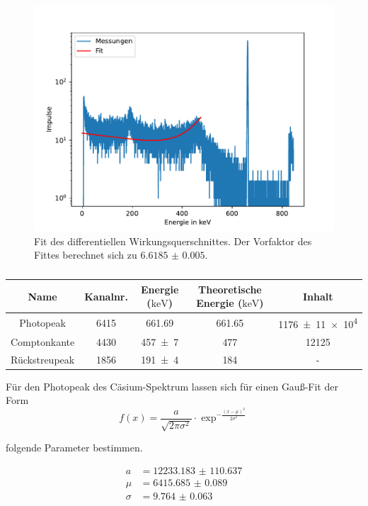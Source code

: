 \begin{figure}[H]
    \centering
    \includegraphics[width=\textwidth]{plots/querschnitt.pdf}
    \caption{Fit des differentiellen Wirkungsquerschnittes. Der Vorfaktor des Fittes berechnet sich zu $\num{6.6185(50)}$.}
    \label{fig:querschnitt}
\end{figure}


\begin{table}[H]
    \centering
    \caption{}
    \label{tab:fit}
    \begin{tabular}{c c c c c}
        \toprule
        {Name} & {Kanalnr.} & {Energie ($\si{\kilo\electronvolt}$)} & Theoretische Energie ($\si{\kilo\electronvolt}$) & Inhalt \\
        \midrule
        {Photopeak} & 6415 & 661.69 & 661.65 & \num{1176(11)e4} \\
        {Comptonkante} & 4430 & \num{457(7)} & 477 & 12125 \\
        {Rückstreupeak} & 1856 & \num{191(4)} & 184 & {-} \\
        \bottomrule
    \end{tabular}
\end{table}


Für den Photopeak des Cäsium-Spektrum lassen sich für einen Gauß-Fit der Form
\begin{equation}
    f(x) = \frac{a}{\sqrt{2\pi \sigma^2}} \cdot \exp^{-\frac{(x-\mu)^2}{2\sigma^2}}
    \label{eq:gauß}
\end{equation}

folgende Parameter bestimmen.

\begin{align}
    a &= \num{12233.183(110637)} \\
    \mu &= \num{6415.685(89)} \\
    \sigma &= \num{9.764(63)}
\end{align}

